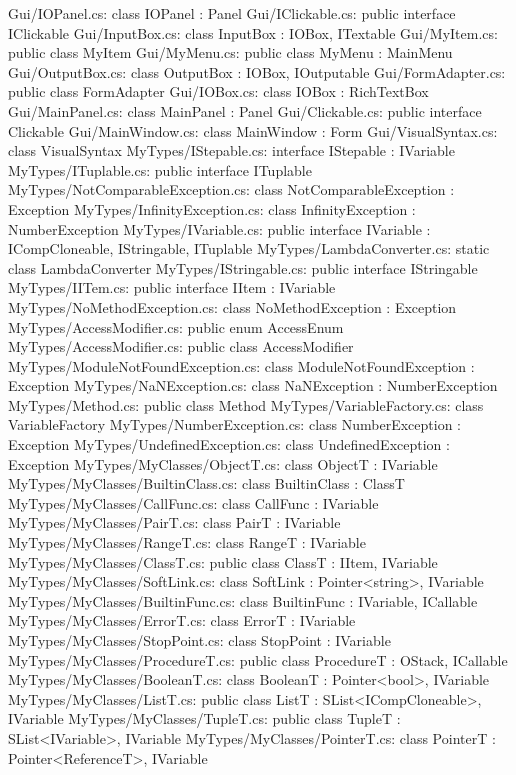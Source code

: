 Gui/IOPanel.cs:	class IOPanel : Panel 
Gui/IClickable.cs:	public interface IClickable 
Gui/InputBox.cs:	class InputBox : IOBox, ITextable 
Gui/MyItem.cs:	public class MyItem 
Gui/MyMenu.cs:	public class MyMenu : MainMenu 
Gui/OutputBox.cs:	class OutputBox : IOBox, IOutputable 
Gui/FormAdapter.cs:	public class FormAdapter 
Gui/IOBox.cs:	class IOBox : RichTextBox 
Gui/MainPanel.cs:	class MainPanel : Panel 
Gui/Clickable.cs:	public interface Clickable 
Gui/MainWindow.cs:	class MainWindow : Form 
Gui/VisualSyntax.cs:	class VisualSyntax 
MyTypes/IStepable.cs:	interface IStepable : IVariable 
MyTypes/ITuplable.cs:	public interface ITuplable 
MyTypes/NotComparableException.cs:	class NotComparableException : Exception 
MyTypes/InfinityException.cs:	class InfinityException : NumberException 
MyTypes/IVariable.cs:	public interface IVariable : ICompCloneable, IStringable, ITuplable 
MyTypes/LambdaConverter.cs:	static class LambdaConverter 
MyTypes/IStringable.cs:	public interface IStringable 
MyTypes/IITem.cs:	public interface IItem : IVariable 
MyTypes/NoMethodException.cs:	class NoMethodException : Exception 
MyTypes/AccessModifier.cs:	public enum AccessEnum 
MyTypes/AccessModifier.cs:	public class AccessModifier 
MyTypes/ModuleNotFoundException.cs:	class ModuleNotFoundException : Exception 
MyTypes/NaNException.cs:	class NaNException : NumberException 
MyTypes/Method.cs:	public class Method 
MyTypes/VariableFactory.cs:	class VariableFactory 
MyTypes/NumberException.cs:	class NumberException : Exception 
MyTypes/UndefinedException.cs:	class UndefinedException : Exception 
MyTypes/MyClasses/ObjectT.cs:	class ObjectT : IVariable 
MyTypes/MyClasses/BuiltinClass.cs:	class BuiltinClass : ClassT 
MyTypes/MyClasses/CallFunc.cs:	class CallFunc : IVariable 
MyTypes/MyClasses/PairT.cs:	class PairT : IVariable 
MyTypes/MyClasses/RangeT.cs:	class RangeT : IVariable 
MyTypes/MyClasses/ClassT.cs:	public class ClassT : IItem, IVariable 
MyTypes/MyClasses/SoftLink.cs:	class SoftLink : Pointer<string>, IVariable 
MyTypes/MyClasses/BuiltinFunc.cs:	class BuiltinFunc : IVariable, ICallable  
MyTypes/MyClasses/ErrorT.cs:	class ErrorT : IVariable 
MyTypes/MyClasses/StopPoint.cs:	class StopPoint : IVariable 
MyTypes/MyClasses/ProcedureT.cs:	public class ProcedureT : OStack, ICallable  
MyTypes/MyClasses/BooleanT.cs:	class BooleanT : Pointer<bool>, IVariable 
MyTypes/MyClasses/ListT.cs:	public class ListT : SList<ICompCloneable>, IVariable 
MyTypes/MyClasses/TupleT.cs:	public class TupleT : SList<IVariable>, IVariable 
MyTypes/MyClasses/PointerT.cs:	class PointerT : Pointer<ReferenceT>, IVariable 
